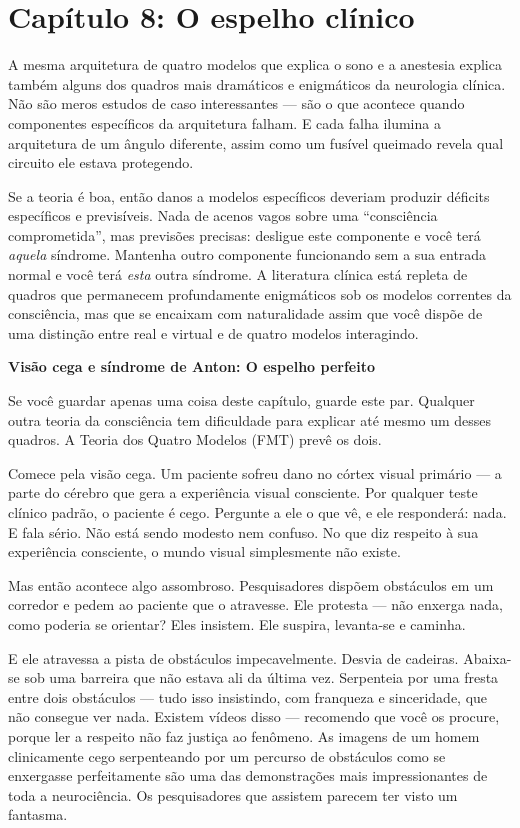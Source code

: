 \documentclass[11pt, twoside, openright]{book}
\begin{document}
\chapter*{Capítulo 8: O espelho clínico}

A mesma arquitetura de quatro modelos que explica o sono e a anestesia explica também alguns dos quadros mais dramáticos e enigmáticos da neurologia clínica. Não são meros estudos de caso interessantes --- são o que acontece quando componentes específicos da arquitetura falham. E cada falha ilumina a arquitetura de um ângulo diferente, assim como um fusível queimado revela qual circuito ele estava protegendo.

Se a teoria é boa, então danos a modelos específicos deveriam produzir déficits específicos e previsíveis. Nada de acenos vagos sobre uma ``consciência comprometida'', mas previsões precisas: desligue este componente e você terá \textit{aquela} síndrome. Mantenha outro componente funcionando sem a sua entrada normal e você terá \textit{esta} outra síndrome. A literatura clínica está repleta de quadros que permanecem profundamente enigmáticos sob os modelos correntes da consciência, mas que se encaixam com naturalidade assim que você dispõe de uma distinção entre real e virtual e de quatro modelos interagindo.

\textbf{Visão cega e síndrome de Anton: O espelho perfeito}

Se você guardar apenas uma coisa deste capítulo, guarde este par. Qualquer outra teoria da consciência tem dificuldade para explicar até mesmo um desses quadros. A Teoria dos Quatro Modelos (FMT) prevê os dois.

Comece pela visão cega. Um paciente sofreu dano no córtex visual primário --- a parte do cérebro que gera a experiência visual consciente. Por qualquer teste clínico padrão, o paciente é cego. Pergunte a ele o que vê, e ele responderá: nada. E fala sério. Não está sendo modesto nem confuso. No que diz respeito à sua experiência consciente, o mundo visual simplesmente não existe.

Mas então acontece algo assombroso. Pesquisadores dispõem obstáculos em um corredor e pedem ao paciente que o atravesse. Ele protesta --- não enxerga nada, como poderia se orientar? Eles insistem. Ele suspira, levanta-se e caminha.

E ele atravessa a pista de obstáculos impecavelmente. Desvia de cadeiras. Abaixa-se sob uma barreira que não estava ali da última vez. Serpenteia por uma fresta entre dois obstáculos --- tudo isso insistindo, com franqueza e sinceridade, que não consegue ver nada. Existem vídeos disso --- recomendo que você os procure, porque ler a respeito não faz justiça ao fenômeno. As imagens de um homem clinicamente cego serpenteando por um percurso de obstáculos como se enxergasse perfeitamente são uma das demonstrações mais impressionantes de toda a neurociência. Os pesquisadores que assistem parecem ter visto um fantasma.
\end{document}
